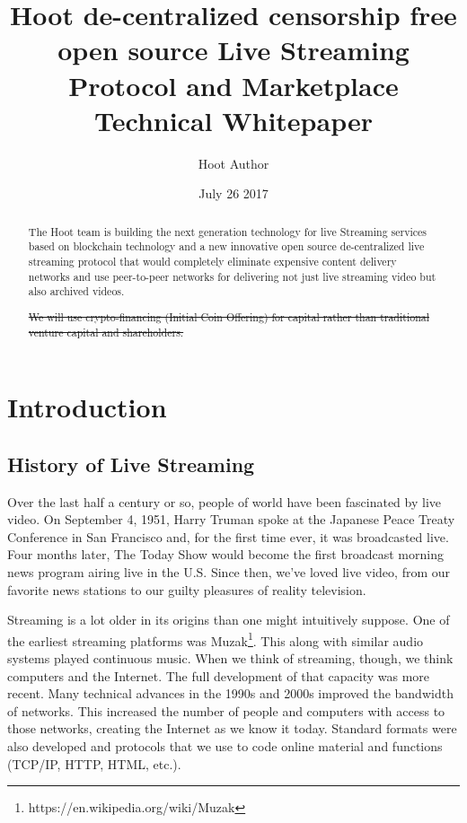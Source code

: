 \documentclass{article}
\title{Hoot de-centralized censorship free open source Live Streaming Protocol and Marketplace Technical Whitepaper}
\author{Hoot Author}
\date{July 26 2017}
\begin{document}
\maketitle

\begin{abstract}
The Hoot team is building the next generation technology for live
Streaming services based on blockchain technology and a new
innovative open source de-centralized live streaming protocol that would completely eliminate expensive content delivery networks and use peer-to-peer networks for delivering not just live streaming video but also archived videos.

\sout{We will use crypto-financing (Initial Coin Offering) for capital rather than traditional venture capital and shareholders.}

\end{abstract}
\newpage

\tableofcontents
\newpage

\section{Introduction}
\subsection{History of Live Streaming}
Over the last half a century or so, people of world have been fascinated by live video. On September 4, 1951, Harry Truman spoke at the Japanese Peace Treaty Conference in San Francisco and, for the first time ever, it was broadcasted live. Four months later, The Today Show would become the first broadcast morning news program airing live in the U.S. Since then, we’ve loved live video, from our favorite news stations to our guilty pleasures of reality television.

Streaming is a lot older in its origins than one might intuitively suppose. One of the earliest streaming platforms was Muzak\footnote{https://en.wikipedia.org/wiki/Muzak}. This along with similar audio systems played continuous music. When we think of streaming, though, we think computers and the Internet. The full development of that capacity was more recent. Many technical advances in the 1990s and 2000s improved the bandwidth of networks. This increased the number of people and computers with access to those networks, creating the Internet as we know it today. Standard formats were also developed and protocols that we use to code online material and functions (TCP/IP, HTTP, HTML, etc.).
\end{document}
